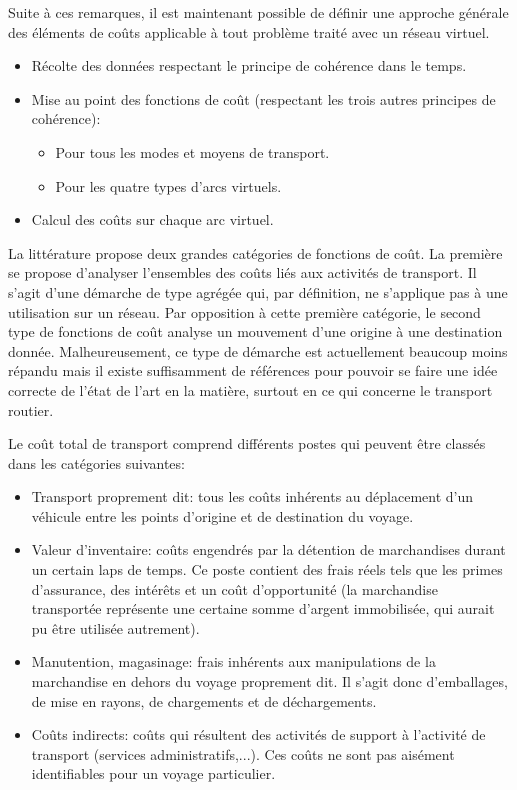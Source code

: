 Suite à ces remarques, il est maintenant possible de définir une
approche générale des éléments de coûts applicable à tout problème
traité avec un réseau virtuel.

\begin{itemize}
\item Récolte des données respectant le principe de cohérence dans le
temps.
\item Mise au point des fonctions de coût (respectant les trois
autres principes de cohérence):
        \begin{itemize}
        \item Pour tous les modes et moyens de transport.
        \item Pour les quatre types d'arcs virtuels.
        \end{itemize}
\item Calcul des coûts sur chaque arc virtuel.
\end{itemize}


La littérature propose deux grandes catégories de fonctions de coût. La première
se propose d'analyser l'ensembles des coûts liés aux activités de transport. Il
s'agit d'une démarche de type agrégée qui, par définition, ne s'applique pas à
une utilisation sur un réseau. Par opposition à cette première catégorie, le
second type de fonctions de coût analyse un mouvement d'une origine à une
destination donnée. Malheureusement, ce type de démarche est actuellement
beaucoup moins répandu mais il existe suffisamment de références pour pouvoir se
faire une idée correcte de l'état de l'art en la matière, surtout en ce qui
concerne le transport routier.

Le coût total de transport comprend différents postes qui peuvent
être classés dans les catégories suivantes:

\begin{itemize}
\item Transport proprement dit: tous les coûts inhérents au déplacement
d'un véhicule entre les points d'origine et de destination du
voyage.

\item Valeur d'inventaire: coûts engendrés par la détention de
marchandises durant un certain laps de temps. Ce poste contient des frais réels
tels que les primes d'assurance, des intérêts et un coût d'opportunité (la
marchan\-dise transportée représente une certaine somme d'argent immobilisée, qui
aurait pu être utilisée autrement).

\item Manutention, magasinage: frais inhérents aux manipulations de la
marchan\-dise en dehors du voyage proprement dit. Il s'agit donc
d'emballages, de mise en rayons, de chargements et de
déchargements.

\item Coûts indirects: coûts qui résultent des activités de support à
l'activité de transport (services administratifs,...). Ces coûts ne
sont pas aisément identifiables pour un voyage particulier.
\end{itemize}

